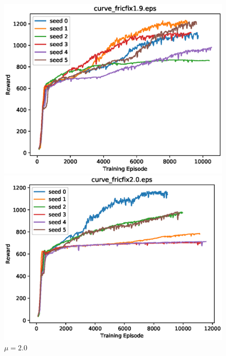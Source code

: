 \begin{figure}[p]
 \begin{minipage}{0.49\hsize}
  \begin{center}
 \includegraphics[width=.99\linewidth]{./fig/curve_fricfix1.9.eps}
  \caption{$\mu=1.9$
  }
  \end{center}
 \end{minipage}
 \begin{minipage}{0.49\hsize}
   \begin{center}
 \includegraphics[width=.99\linewidth]{./fig/curve_fricfix2.0.eps}
  \caption{$\mu=2.0$
     }
  \end{center}
 \end{minipage}
\end{figure}

